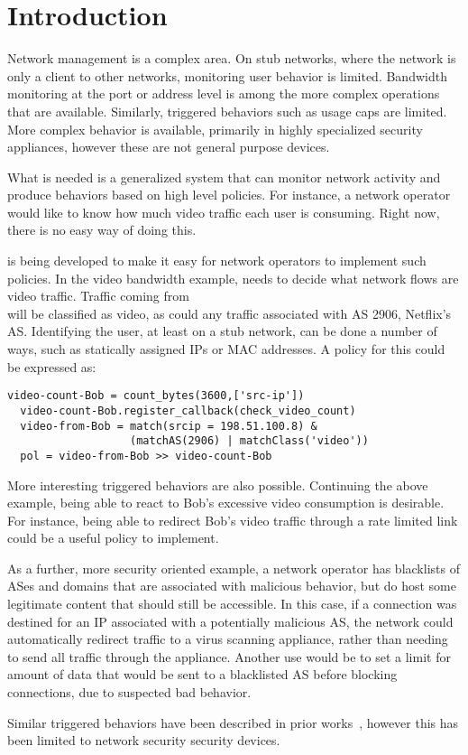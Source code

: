 \section{Introduction}
Network management is a complex area. On stub networks, where the network is only a client to other networks, monitoring user behavior is limited. Bandwidth monitoring at the port or address level is among the more complex operations that are available. Similarly, triggered behaviors such as usage caps are limited. 
More complex behavior is available, primarily in highly specialized security appliances, however these are not general purpose devices.

What is needed is a generalized system that can monitor network activity and produce behaviors based on high level policies. For instance, a network operator would like to know how much video traffic each user is consuming. Right now, there is no easy way of doing this. 

\system{} is being developed to make it easy for network operators to implement such policies. In the video bandwidth example, \system{} needs to decide what network flows are video traffic. Traffic coming from \\ will be classified as video, as could any traffic associated with AS 2906, Netflix's AS. Identifying the user, at least on a stub network, can be done a number of ways, such as statically assigned IPs or MAC addresses. A policy for this could be expressed as:

\begin{Verbatim}[fontsize=\small]
  video-count-Bob = count_bytes(3600,['src-ip'])
  video-count-Bob.register_callback(check_video_count)
  video-from-Bob = match(srcip = 198.51.100.8) & 
                   (matchAS(2906) | matchClass('video'))
  pol = video-from-Bob >> video-count-Bob
\end{Verbatim}
  

More interesting triggered behaviors are also possible. Continuing the above example, being able to react to Bob's excessive video consumption is desirable. For instance, being able to redirect Bob's video traffic through a rate limited link could be a useful policy to implement. 

As a further, more security oriented example, a network operator has blacklists of ASes and domains that are associated with malicious behavior, but do host some legitimate content that should still be accessible. In this case, if a connection was destined for an IP associated with a potentially malicious AS, the network could automatically redirect traffic to a virus scanning appliance, rather than needing to send all traffic through the appliance. Another use would be to set a limit for amount of data that would be sent to a blacklisted AS before blocking connections, due to suspected bad behavior.

Similar triggered behaviors have been described in prior works~\cite{cloudwatcher}\cite{opensafe}, however this has been limited to network security security devices.
